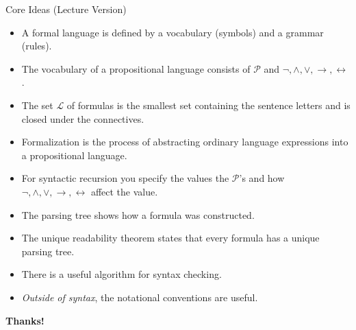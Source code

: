 \begin{frame}{Core Ideas (Lecture Version)}
 
 
 \begin{itemize}

	\item A formal language is defined by a vocabulary (symbols) and a grammar (rules).
	
	\item The vocabulary of a propositional language consists of $\mathcal{P}$ and $\neg,\land,\lor,\to,\leftrightarrow$.
	
	\item The set $\mathcal{L}$ of formulas is the smallest set containing the sentence letters and is closed under the connectives. 
	
	\item Formalization is the process of abstracting ordinary language expressions into a propositional language.
	
	\item For syntactic recursion you specify the values the $\mathcal{P}$'s and how $\neg,\land,\lor,\to,\leftrightarrow$ affect the value.
	
	\item The parsing tree shows how a formula was constructed.
	
	\item The unique readability theorem states that every formula has a unique parsing tree.
	
	\item There is a useful algorithm for syntax checking.
	
	\item \emph{Outside of syntax}, the notational conventions are useful.

\end{itemize}


\end{frame}


\begin{frame}

	\begin{center}
	{\huge\bf Thanks!}
	\end{center}

\end{frame}

